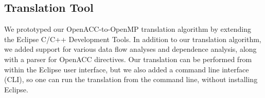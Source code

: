 \documentclass{sig-alternate-05-2015}
\newcommand\todo[1]{\textcolor{red}{** #1}}
\newcommand{\pooda}{\textsc{POOD}\xspace}
\newcommand{\pood}{\textsc{Porting OpenACC To OpenMP Directives}\xspace}
\begin{document}
\subsection{Translation Tool}

We prototyped our OpenACC-to-OpenMP translation algorithm by extending the
Eclipse C/C++ Development Tools.  In addition to our translation algorithm, we
added support for various data flow analyses and dependence analysis, along
with a parser for OpenACC directives.  Our translation can be performed from
within the Eclipse user interface, but we also added a command line interface
(CLI), so one can run the translation from the command line, without installing
Eclipse. 

%  
%
%
%
%
%
\end{document}
